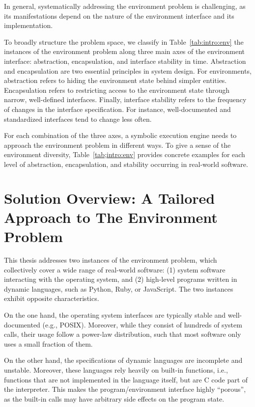 In general, systematically addressing the environment problem is challenging, as its manifestations depend on the nature of the environment interface and its implementation.

To broadly structure the problem space, we classify in Table~\ref{tab:intro:env} the instances of the environment problem along three main axes of the environment interface: abstraction, encapsulation, and interface stability in time.
%
Abstraction and encapsulation are two essential principles in system design.  For environments, abstraction refers to hiding the environment state behind simpler entities.
%
Encapsulation refers to restricting access to the environment state through narrow, well-defined interfaces.
%
Finally, interface stability refers to the frequency of changes in the interface specification.  For instance, well-documented and standardized interfaces tend to change less often.

For each combination of the three axes, a symbolic execution engine needs to approach the environment problem in different ways.
%
To give a sense of the environment diversity, Table~\ref{tab;intro:env} provides concrete examples for each level of abstraction, encapsulation, and stability occurring in real-world software.



\section{Solution Overview: A Tailored Approach to The Environment Problem}

This thesis addresses two instances of the environment problem, which collectively cover a wide range of real-world software: (1) system software interacting with the operating system, and (2) high-level programs written in dynamic languages, such as Python, Ruby, or JavaScript.
%
The two instances exhibit opposite characteristics.

On the one hand, the operating system interfaces are typically stable and well-documented (e.g., POSIX).  Moreover, while they consist of hundreds of system calls, their usage follow a power-law distribution, such that most software only uses a small fraction of them.

On the other hand, the specifications of dynamic languages are incomplete and unstable.
%
Moreover, these languages rely heavily on built-in functions, i.e., functions that are not implemented in the language itself, but are C code part of the interpreter.  This makes the program/environment interface highly ``porous'', as the built-in calls may have arbitrary side effects on the program state.

